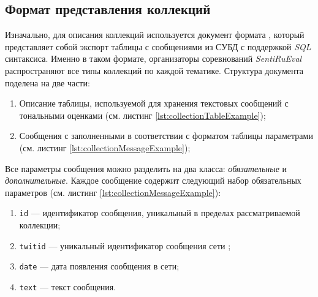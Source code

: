 \subsection{Формат представления коллекций}
    \label{sec:programmingInnerFormat}

    Изначально, для описания коллекций используется документ формата \xml,
    который представляет собой экспорт таблицы с сообщениями из СУБД с поддержкой
    {\it SQL} синтаксиса.
    Именно в таком формате, организаторы соревнований {\it SentiRuEval}
    распространяют все типы коллекций по каждой тематике. Структура документа
    поделена на две части:
    \begin{enumerate}
        \item Описание таблицы, используемой для хранения текстовых сообщений с
            тональными оценками (см. листинг \ref{lst:collectionTableExample});
        \item Сообщения с заполненными в соответствии с форматом таблицы
            параметрами (см. листинг \ref{lst:collectionMessageExample});
    \end{enumerate}

    \newpage
    \lstset{style=xml}
    \newpage
    

    \lstset{style=xml}
    

    Все параметры сообщения можно разделить на два класса: {\it обязательные} и
    {\it дополнительные}. Каждое сообщение содержит следующий набор
    обязательных параметров (см. листинг \ref{lst:collectionMessageExample}):
    \begin{enumerate}
        \item {\tt id} --- идентификатор сообщения, уникальный в пределах рассматриваемой коллекции;
        \item {\tt twitid} --- уникальный идентификатор сообщения сети \twitter;
        \item {\tt date} --- дата появления сообщения в сети;
        \item {\tt text} --- текст сообщения.
    \end{enumerate}

